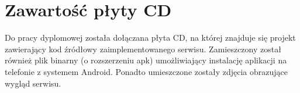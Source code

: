 \chapter{Zawartość płyty CD}
\thispagestyle{chapterBeginStyle}
\label{plytaCD}

Do pracy dyplomowej została dołączana płyta CD, na której znajduje się projekt zawierający kod źródłowy zaimplementowanego serwisu. Zamieszczony został również plik binarny (o rozszerzeniu apk) umożliwiający instalację aplikacji na telefonie z systemem Android. Ponadto umieszczone zostały zdjęcia obrazujące wygląd serwisu.

